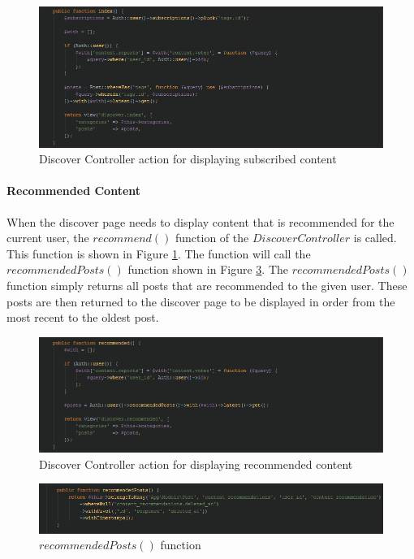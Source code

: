 \begin{figure}[H]
\centering
\includegraphics[width=\textwidth]{Images/Implementation/DiscoverControllerSubscribed}
\caption{Discover Controller action for displaying subscribed content}
\label{fig:DiscoverControllerSubscribed}
\end{figure}

\paragraph{Recommended Content}
When the discover page needs to display content that is recommended for the current user, the $recommend()$ function of the $Discover  Controller$ is called. This function is shown in Figure \ref{fig:DiscoverControllerSubscribed}. The function will call the $recommendedPosts()$ function shown in Figure \ref{fig:RecommendedPosts}. The $recommendedPosts()$ function simply returns all posts that are recommended to the given user. These posts are then returned to the discover page to be displayed in order from the most recent to the oldest post.

\begin{figure}[H]
\centering
\includegraphics[width=\textwidth]{Images/Implementation/DiscoverControllerRecommended}
\caption{Discover Controller action for displaying recommended content }
\label{fig:DiscoverControllerRecommended}
\end{figure}

\begin{figure}[H]
\centering
\includegraphics[width=\textwidth]{Images/Implementation/RecommendedPosts}
\caption{$recommendedPosts()$ function}
\label{fig:RecommendedPosts}
\end{figure}

